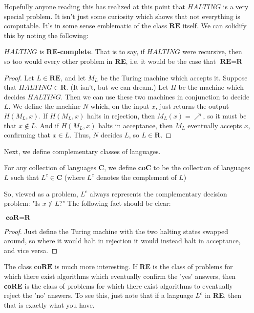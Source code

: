 \par Hopefully anyone reading this has realized at this point that $HALTING$ is a very special problem. It isn't just some curiosity which shows that not everything is computable. It's in some sense emblematic of the class $\textbf{RE}$ itself. We can solidify this by noting the following:
\begin{fact}
    $HALTING$ is \textbf{RE-complete}. That is to say, if $HALTING$ were recursive, then so too would every other problem in \textbf{RE}, i.e. it would be the case that $\textbf{RE} = \textbf{R}$
\end{fact}
\begin{proof}
    Let $L \in \textbf{RE}$, and let $M_L$ be the Turing machine which accepts it. Suppose that $HALTING \in \textbf{R}$. (It isn't, but we can dream.) Let $H$ be the machine which decides $HALTING$. Then we can use these two machines in conjunction to decide $L$. We define the machine $N$ which, on the input $x$, just returns the output $H(M_L,x)$. If $H(M_L,x)$ halts in rejection, then $M_L(x)=\nearrow$, so it must be that $x \notin L$. And if $H(M_L,x)$ halts in acceptance, then $M_L$ eventually accepts $x$, confirming that $x \in L$. Thus, $N$ decides $L$, so $L \in \textbf{R}$. 
\end{proof}
\par Next, we define complementary classes of languages.
\begin{definition}
    For any collection of languages $\textbf{C}$, we define $\textbf{coC}$ to be the collection of languages $L$ such that $L^c \in \textbf{C}$ (where $L^c$ denotes the complement of $L$)
\end{definition}
So, viewed as a problem, $L^c$ always represents the complementary decision problem: "Is $x \notin L$?" The following fact should be clear:
\begin{fact}
    $\textbf{coR} = \textbf{R}$
\end{fact}
\begin{proof}
    Just define the Turing machine with the two halting states swapped around, so where it would halt in rejection it would instead halt in acceptance, and vice versa.
\end{proof}
The class $\textbf{coRE}$ is much more interesting. If \textbf{RE} is the class of problems for which there exist algorithms which eventually confirm the 'yes' answers, then \textbf{coRE} is the class of problems for which there exist algorithms to eventually reject the 'no' answers. To see this, just note that if a language $L^c$ in \textbf{RE}, then that is exactly what you have.
